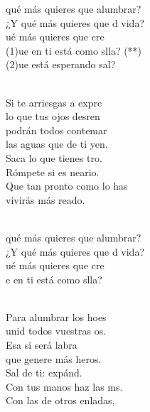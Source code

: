 \begin{cancion}%
	\begin{chorus}%
	 qué más quieres que alumbrar?\\
	¿Y qué más quieres que d vida?\\
	ué más quieres que cre \\
	(1)ue en ti está como slla? (**)\\
	(2)ue está esperando sal?\\
	\end{chorus}%
	\jump\\
	Si te arriesgas a expre \\
	lo que tus ojos desren\\
	podrán todos contemar\\
	las aguas que de ti yen.\\
	Saca lo que tienes tro. \\
	Rómpete si es neario.\\
	Que tan pronto como lo has \\
	vivirás más reado.\\\jump\\
	\begin{chorus}%
	 qué más quieres que alumbrar?\\
	¿Y qué más quieres que d vida?\\
	ué más quieres que cre \\
	e en ti está como slla?\\
	\end{chorus}%
	\jump\\
	Para alumbrar los hoes \\
	unid todos vuestras os.\\
	Esa si será labra\\
	que genere más heros.\\
	Sal de ti: expánd. \\
	Con tus manos haz las ms.\\
	Con las de otros enladas,\\

\end{cancion}
